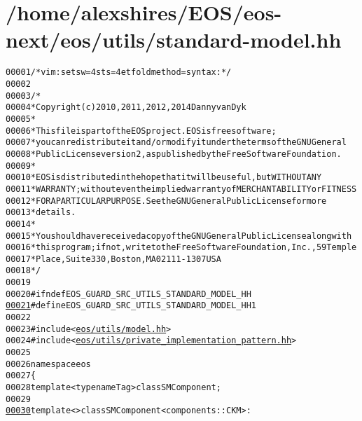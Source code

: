 \hypertarget{standard-model_8hh_source}{
\section{/home/alexshires/EOS/eos-\/next/eos/utils/standard-\/model.hh}
}


\begin{footnotesize}\begin{alltt}
00001 \textcolor{comment}{/* vim: set sw=4 sts=4 et foldmethod=syntax : */}
00002 
00003 \textcolor{comment}{/*}
00004 \textcolor{comment}{ * Copyright (c) 2010, 2011, 2012, 2014 Danny van Dyk}
00005 \textcolor{comment}{ *}
00006 \textcolor{comment}{ * This file is part of the EOS project. EOS is free software;}
00007 \textcolor{comment}{ * you can redistribute it and/or modify it under the terms of the GNU General}
00008 \textcolor{comment}{ * Public License version 2, as published by the Free Software Foundation.}
00009 \textcolor{comment}{ *}
00010 \textcolor{comment}{ * EOS is distributed in the hope that it will be useful, but WITHOUT ANY}
00011 \textcolor{comment}{ * WARRANTY; without even the implied warranty of MERCHANTABILITY or FITNESS}
00012 \textcolor{comment}{ * FOR A PARTICULAR PURPOSE.  See the GNU General Public License for more}
00013 \textcolor{comment}{ * details.}
00014 \textcolor{comment}{ *}
00015 \textcolor{comment}{ * You should have received a copy of the GNU General Public License along with}
00016 \textcolor{comment}{ * this program; if not, write to the Free Software Foundation, Inc., 59 Temple}
00017 \textcolor{comment}{ * Place, Suite 330, Boston, MA  02111-1307  USA}
00018 \textcolor{comment}{ */}
00019 
00020 \textcolor{preprocessor}{#ifndef EOS\_GUARD\_SRC\_UTILS\_STANDARD\_MODEL\_HH}
\hypertarget{standard-model_8hh_source_l00021}{}\hyperlink{standard-model_8hh_a0c02f85a1317b76d20ec8cf296dd1d26}{00021} \textcolor{preprocessor}{}\textcolor{preprocessor}{#define EOS\_GUARD\_SRC\_UTILS\_STANDARD\_MODEL\_HH 1}
00022 \textcolor{preprocessor}{}
00023 \textcolor{preprocessor}{#include <\hyperlink{model_8hh}{eos/utils/model.hh}>}
00024 \textcolor{preprocessor}{#include <\hyperlink{private__implementation__pattern_8hh}{eos/utils/private_implementation_pattern.hh}>}
00025 
00026 \textcolor{keyword}{namespace }eos
00027 \{
00028     \textcolor{keyword}{template} <\textcolor{keyword}{typename} Tag> \textcolor{keyword}{class }SMComponent;
00029 
\hypertarget{standard-model_8hh_source_l00030}{}\hyperlink{classeos_1_1SMComponent_3_01components_1_1CKM_01_4}{00030}     \textcolor{keyword}{template} <> \textcolor{keyword}{class }SMComponent<components::CKM> :

\end{alltt}
\end{footnotesize}
